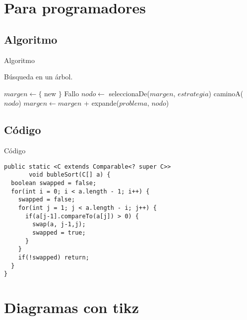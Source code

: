 \documentclass[aspectratio=169,usenames,dvipsnames,svgnames,table]{beamer}
\begin{document}
\section{Para programadores}
\subsection{Algoritmo}

\begin{frame}{Algoritmo}
\begin{algorithm}[H]
\caption{Búsqueda en un árbol.}\label{alg:busqueda_general}
\begin{algorithmic}[1]
   \State $margen \leftarrow \{$ new $\}$
   \Loop
     \Return Fallo \EndIf
    \State $nodo \leftarrow$ seleccionaDe($margen$, $estrategia$)
     \State \Return caminoA($nodo$)
    \EndIf
    \State $margen \leftarrow margen$ + expande($problema$, $nodo$) \label{alg:estrategia}
   \EndLoop
  \EndFunction
\end{algorithmic}
\end{algorithm}
\end{frame}



\subsection{Código}

\begin{frame}[fragile]{Código}
\begin{lstlisting}
public static <C extends Comparable<? super C>>
       void bubleSort(C[] a) {
  boolean swapped = false;
  for(int i = 0; i < a.length - 1; i++) {
    swapped = false;
    for(int j = 1; j < a.length - i; j++) {
      if(a[j-1].compareTo(a[j]) > 0) {
        swap(a, j-1,j);
        swapped = true;
      }
    }
    if(!swapped) return;
  }
}
\end{lstlisting}
\end{frame}




\section{Diagramas con tikz}
\end{document}
